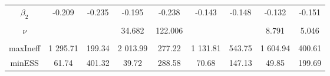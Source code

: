 \begin{footnotesize}
\begin{singlespace}
\begin{tabular}{ccccccccc}
$ \beta_{2} $ & -0.209 & -0.235 & -0.195 & -0.238 & -0.143 & -0.148 & -0.132 & -0.151 \\ 
 & \begin{tiny} [-0.278,-0.141] \end{tiny}  & \begin{tiny} [-0.307,-0.162] \end{tiny}  & \begin{tiny} [-0.261,-0.128] \end{tiny}  & \begin{tiny} [-0.311,-0.165] \end{tiny}  & \begin{tiny} [-0.23,-0.055] \end{tiny}  & \begin{tiny} [-0.222,-0.076] \end{tiny}  & \begin{tiny} [-0.22,-0.041] \end{tiny}  & \begin{tiny} [-0.26,-0.041] \end{tiny}  \\ 
$\nu$ &  &  & 34.682 &  122.006 &  &  & 8.791 & 5.046 \\ 
 &  &  & \begin{tiny} [28.6,41.8] \end{tiny}  & \begin{tiny} [ 110.9, 128] \end{tiny}  &  &  & \begin{tiny} [6.2,12] \end{tiny}  & \begin{tiny} [4.7,5.5] \end{tiny}  \\  \midrule 
maxIneff & 1 295.71 &  199.34 & 2 013.99 &  277.22 & 1 131.81 &  543.75 & 1 604.94 &  400.61 \\ 
minESS & 61.74 &  401.32 & 39.72 &  288.58 & 70.68 &  147.13 & 49.85 &  199.69 \\ \bottomrule 
\end{tabular}
\end{singlespace}
\end{footnotesize}



